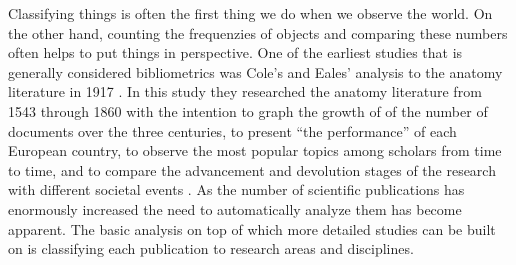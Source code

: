 Classifying things is often the first thing we do when we observe 
the world. On the other hand, counting the frequenzies of objects
and comparing these numbers often helps to put things in 
perspective.
One of the earliest studies that is generally considered
bibliometrics was Cole's and Eales' analysis to the anatomy 
literature in 1917 \cite{cole_history_1917}. In this study they 
researched the anatomy literature from 1543 through 1860 with the 
intention to graph the growth of of the number of documents over 
the three centuries, to present ``the performance'' of each 
European country, to observe the most popular topics among 
scholars from time to time, and to compare the advancement and 
devolution stages of the research with different societal 
events \cite{bellis_bibliometrics_2009}.
As the number of scientific publications has enormously increased
the need to automatically analyze them has become apparent.
The basic analysis on top of which more detailed studies can be 
built on is classifying each publication to research areas and
disciplines.


